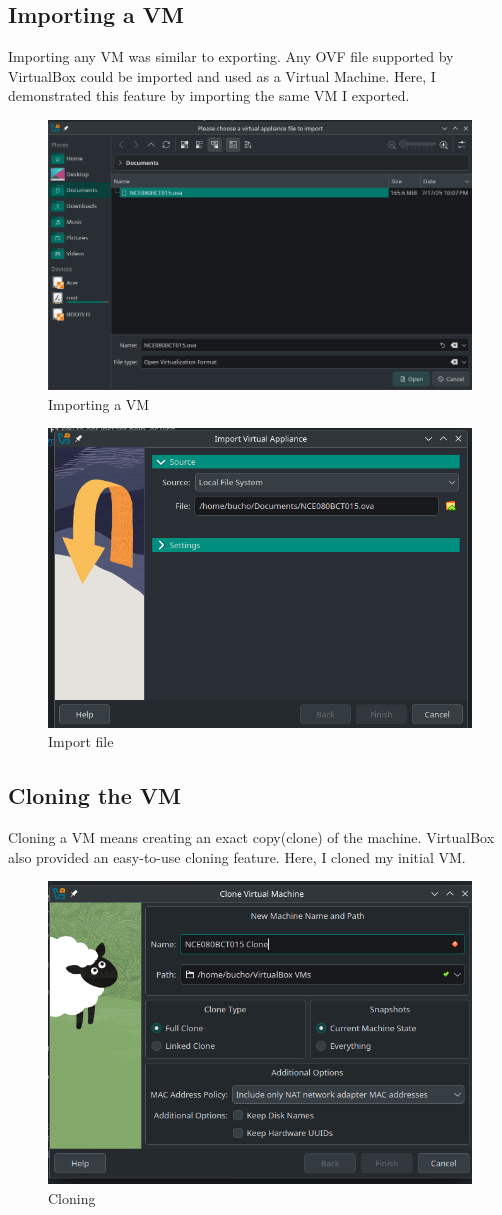 \documentclass[a4paper,12pt]{report}
\begin{document}
\subsection{Importing a VM}
Importing any VM was similar to exporting. Any OVF file supported by VirtualBox could be imported and used as a Virtual Machine. 
Here, I demonstrated this feature by importing the same VM I exported.
\begin{figure}[h]
    \centering
    \includegraphics[width=0.5\linewidth]{import.png}
    \caption{Importing a VM}
    \label{fig27}
\end{figure}
\begin{figure}[h]
    \centering
    \includegraphics[width=0.5\linewidth]{import2.png}
    \caption{Import file}
    \label{fig27}
\end{figure}
\newpage
\subsection{Cloning the VM}
Cloning a VM means creating an exact copy(clone) of the machine. VirtualBox also provided an easy-to-use cloning feature. Here, I cloned my initial VM.
\begin{figure}[h]
    \centering
    \includegraphics[width=0.5\linewidth]{clone.png}
    \caption{Cloning}
    \label{fig28}
\end{figure}
\end{document}
